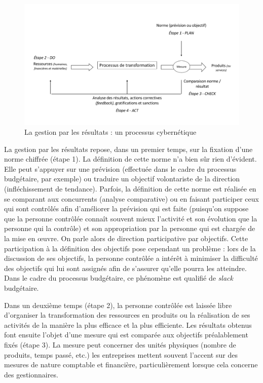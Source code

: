 \documentclass[oneside]{kaobook}
\begin{document}
\begin{figure}[H]

\includegraphics{./img/gestionobj.pdf}
\caption{La gestion par les résultats : un processus cybernétique}
\end{figure}
La gestion par les résultats repose, dans un premier temps, sur la fixation d’une norme chiffrée (étape 1). La définition de cette norme n’a bien sûr rien d’évident. Elle peut s’appuyer sur une prévision (effectuée dans le cadre du processus budgétaire, par exemple) ou traduire un objectif volontariste de la direction (infléchissement de tendance). Parfois, la définition de cette norme est réalisée en se comparant aux concurrents (analyse comparative) ou en faisant participer ceux qui sont contrôlés afin d’améliorer la prévision qui est faite (puisqu’on suppose que la personne contrôlée connaît souvent mieux l’activité et son évolution que la personne qui la contrôle) et son appropriation par la personne qui est chargée de la mise en œuvre. On parle alors de direction participative par objectifs. Cette participation à la définition des objectifs pose cependant un problème : lors de la discussion de ses objectifs, la personne contrôlée a intérêt à minimiser la difficulté des objectifs qui lui sont assignés afin de s’assurer qu’elle pourra les atteindre. Dans le cadre du processus budgétaire, ce phénomène est qualifié de \emph{slack} budgétaire.

Dans un deuxième temps (étape 2), la personne contrôlée est laissée libre d’organiser la transformation des ressources en produits ou la réalisation de ses activités de la manière la plus efficace et la plus efficiente. 
Les résultats obtenus font ensuite l’objet d’une mesure qui est comparée aux objectifs préalablement fixés (étape 3). La mesure peut concerner des unités physiques (nombre de produits, temps passé, etc.) les entreprises mettent souvent l’accent sur des mesures de nature comptable et financière, particulièrement lorsque cela concerne des gestionnaires.
\end{document}
